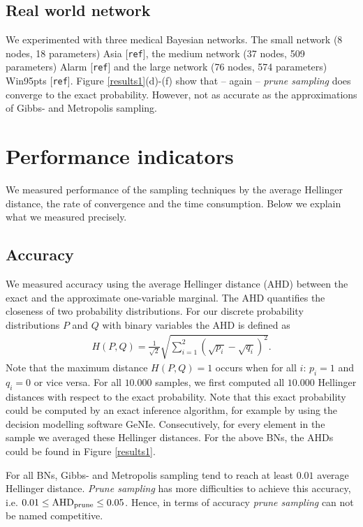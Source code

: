 \documentclass[a4paper, twoside, 11pt]{report}
\theoremstyle{plain}
\theoremstyle{definition}
\theoremstyle{remark}
\begin{document}
\subsection{Real world network}
We experimented with three medical Bayesian networks. The small network (8 nodes, 18 parameters) Asia [\texttt{ref}], the medium network (37 nodes, 509 parameters) Alarm [\texttt{ref}] and the large network (76 nodes, 574 parameters) Win95pts [\texttt{ref}]. Figure \ref{results1}(d)-(f) show that -- again -- \textit{prune sampling} does converge to the exact probability. However, not as accurate as the approximations of Gibbs- and Metropolis sampling.


\section{Performance indicators}
We measured performance of the sampling techniques by the average Hellinger distance, the rate of convergence and the time consumption. Below we explain what we measured precisely.

\subsection{Accuracy}
We measured accuracy using the average Hellinger distance (AHD) between the exact and the approximate one-variable marginal. The AHD quantifies the closeness of two probability distributions. For our discrete probability distributions $P$ and $Q$ with binary variables the AHD is defined as
\begin{align*}
H(P,Q) = \frac{1}{\sqrt{2}}\sqrt{ \sum_{i=1}^2 ( \sqrt{p_i} - \sqrt{q_i})^2 }.
\end{align*}
Note that the maximum distance $H(P,Q) = 1$ occurs when for all $i$: $p_i =1$ and $q_i = 0$ or vice versa. For all $10.000$ samples, we first computed all $10.000$ Hellinger distances with respect to the exact probability. Note that this exact probability could be computed by an exact inference algorithm, for example by using the decision modelling software GeNIe. Consecutively, for every element in the sample we averaged these Hellinger distances. For the above BNs, the AHDs could be found in Figure \ref{results1}. 

For all BNs, Gibbs- and Metropolis sampling tend to reach at least $0.01$ average Hellinger distance. \textit{Prune sampling} has more difficulties to achieve this accuracy, i.e. $0.01 \leq \text{AHD}\textsubscript{prune} \leq 0.05$. Hence, in terms of accuracy \textit{prune sampling} can not be named competitive. 
\end{document}
